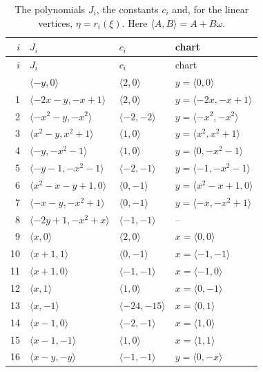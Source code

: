 \documentclass[11pt]{article}
\begin{document}
\begingroup\small
\setlength{\LTcapwidth}{\textwidth}
\begin{longtable}{@{}rlll@{}}
\caption{The polynomials $J_i$, the constants $c_i$ and, for the linear vertices, $\eta=r_i(\xi)$. Here $\langle A,B\rangle=A+B\omega$.}\label{tab:cvert1}\\
\hline $i$ & $J_i$ & $c_i$ & chart\\\hline\endfirsthead\hline $i$ & $J_i$ & $c_i$ & chart\\\hline\endhead\hline\endfoot
0 & $\langle -y,0\rangle$ & $\langle 2,0\rangle$ & $y=\langle 0,0\rangle$\\
1 & $\langle -2x-y,-x+1\rangle$ & $\langle 2,0\rangle$ & $y=\langle -2x,-x+1\rangle$\\
2 & $\langle -x^{2}-y,-x^{2}\rangle$ & $\langle -2,-2\rangle$ & $y=\langle -x^{2},-x^{2}\rangle$\\
3 & $\langle x^{2}-y,x^{2}+1\rangle$ & $\langle 1,0\rangle$ & $y=\langle x^{2},x^{2}+1\rangle$\\
4 & $\langle -y,-x^{2}-1\rangle$ & $\langle 1,0\rangle$ & $y=\langle 0,-x^{2}-1\rangle$\\
5 & $\langle -y-1,-x^{2}-1\rangle$ & $\langle -2,-1\rangle$ & $y=\langle -1,-x^{2}-1\rangle$\\
6 & $\langle x^{2}-x-y+1,0\rangle$ & $\langle 0,-1\rangle$ & $y=\langle x^{2}-x+1,0\rangle$\\
7 & $\langle -x-y,-x^{2}+1\rangle$ & $\langle 0,-1\rangle$ & $y=\langle -x,-x^{2}+1\rangle$\\
8 & $\langle -2y+1,-x^{2}+x\rangle$ & $\langle -1,-1\rangle$ & --\\
9 & $\langle x,0\rangle$ & $\langle 2,0\rangle$ & $x=\langle 0,0\rangle$\\
10 & $\langle x+1,1\rangle$ & $\langle 0,-1\rangle$ & $x=\langle -1,-1\rangle$\\
11 & $\langle x+1,0\rangle$ & $\langle -1,-1\rangle$ & $x=\langle -1,0\rangle$\\
12 & $\langle x,1\rangle$ & $\langle 1,0\rangle$ & $x=\langle 0,-1\rangle$\\
13 & $\langle x,-1\rangle$ & $\langle -24,-15\rangle$ & $x=\langle 0,1\rangle$\\
14 & $\langle x-1,0\rangle$ & $\langle -2,-1\rangle$ & $x=\langle 1,0\rangle$\\
15 & $\langle x-1,-1\rangle$ & $\langle 1,0\rangle$ & $x=\langle 1,1\rangle$\\
16 & $\langle x-y,-y\rangle$ & $\langle -1,-1\rangle$ & $y=\langle 0,-x\rangle$\\

\end{longtable}
\end{document}
